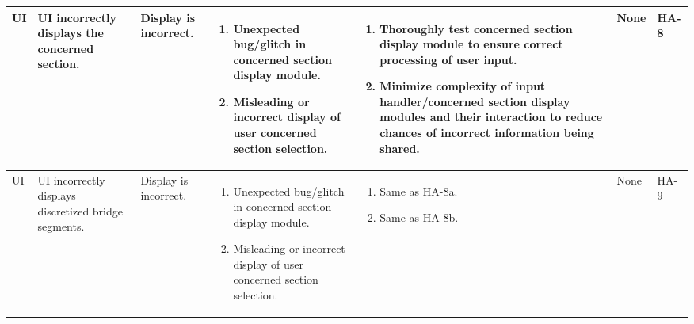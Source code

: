 \documentclass{article}
\begin{document}
\begin{landscape}
\begin{longtable}{|p{} | p{} | p{} | p{} | p{} | p{} | p{}|}
  UI & UI incorrectly displays the concerned section. & Display is incorrect. & 
  \begin{enumerate}[leftmargin=*, label={\alph*.}, itemsep=1pt, topsep=0pt, partopsep=0pt] 
    \item Unexpected bug/glitch in concerned section display module.
    \item Misleading or incorrect display of user concerned section selection.
  \end{enumerate} &
  \begin{enumerate}[leftmargin=*, label={\alph*.}, itemsep=1pt, topsep=0pt, partopsep=0pt] 
    \item Thoroughly test concerned section display module to ensure correct processing of user input.
    \item Minimize complexity of input handler/concerned section display modules and their interaction to 
    reduce chances of incorrect information being shared.
  \end{enumerate} &
  None & HA-8 \\

  \hline
  
  UI & UI incorrectly displays discretized bridge segments. & Display is incorrect. & 
  \begin{enumerate}[leftmargin=*, label={\alph*.}, itemsep=1pt, topsep=0pt, partopsep=0pt] 
    \item Unexpected bug/glitch in concerned section display module.
    \item Misleading or incorrect display of user concerned section selection.
  \end{enumerate} &
  \begin{enumerate}[leftmargin=*, label={\alph*.}, itemsep=1pt, topsep=0pt, partopsep=0pt] 
    \item Same as HA-8a.
    \item Same as HA-8b.
  \end{enumerate} &
  None & HA-9 \\

  \hline


\end{longtable}
\end{landscape}
\end{document}
